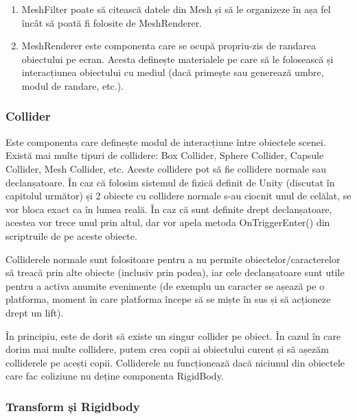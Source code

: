 \documentclass[12pt, a4paper]{article}
\begin{document}
	\begin{enumerate}
		\item MeshFilter poate să citească datele din Mesh și să le organizeze în așa fel încât să poată fi folosite de MeshRenderer.
		\item MeshRenderer este componenta care se ocupă propriu-zis de randarea obiectului pe ecran. Acesta definește materialele pe care să le folosească și interacțiunea obiectului cu mediul (dacă primește sau generează umbre, modul de randare, etc.).
	\end{enumerate}
	
	
	
	
	
	\subsubsection{Collider}
	
	Este componenta care definește modul de interacțiune între obiectele scenei. Există mai multe tipuri de collidere: Box Collider, Sphere Collider, Capsule Collider, Mesh Collider, etc. Aceste collidere pot să fie collidere normale sau declanșatoare. În caz că folosim sistemul de fizică definit de Unity (discutat în capitolul următor) și 2 obiecte cu collidere normale s-au ciocnit unul de celălat, se vor bloca exact ca în lumea reală. În caz că sunt definite drept declanșatoare, acestea vor trece unul prin altul, dar vor apela metoda OnTriggerEnter() din scriptruile de pe aceste obiecte.
	\newline
	
	Colliderele normale sunt folositoare pentru a nu permite obiectelor/caracterelor să treacă prin alte obiecte (inclusiv prin podea), iar cele declanșatoare sunt utile pentru a activa anumite evenimente (de exemplu un caracter se așează pe o platforma, moment în care platforma începe să se miște în sus și să acționeze drept un lift).
	\newline
	
	În principiu, este de dorit să existe un singur collider pe obiect. În cazul în care dorim mai multe collidere, putem crea copii ai obiectului curent și să așezăm colliderele pe acești copii. Colliderele nu funcționează dacă niciunul din obiectele care fac coliziune nu deține componenta RigidBody.
	
	
	
	
	\subsubsection{Transform și Rigidbody}
	
\end{document}
